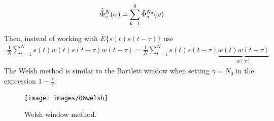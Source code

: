 \begin{equation*}
\hat{\hat{\Phi}}_s^N(\omega) = \sum_{k=1}^8 \hat{\Phi}_s^{N_0}(\omega)
\end{equation*}

Then, instead of working with $\bar{E}\{s(t)s(t-\tau)\}$ use
\begin{align*}
\frac{1}{N}\sum_{t=1}^N s(t)w(t)s(t-\tau)w(t-\tau) =
\frac{1}{N}\sum_{t=1}^N s(t)s(t-\tau) \underbrace{w(t)w(t-\tau)}_{w(\tau)}
\end{align*}
The Welsh method is similar to the Bartlett window when setting $\gamma=N_0$ in the expression $1-\frac{\tau}{\gamma}$.

\begin{figure}[ht!]
\centering
\texttt{[image: images/06welsh]}
\caption{Welsh window method.}%
\label{fig:06welsh}
\end{figure}
